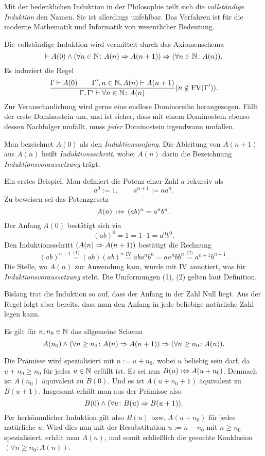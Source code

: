 Mit der bedenklichen Induktion in der Philosophie teilt sich die
\emph{vollständige Induktion} den Namen. Sie ist allerdings unfehlbar.
Das Verfahren ist für die moderne Mathematik und Informatik von
wesentlicher Bedeutung.

Die vollständige Induktion%
wird vermittelt durch das Axiomenschema
\[\vdash A(0)\land (\forall n\in\mathbb N\colon A(n)\Rightarrow A(n+1))
\Rightarrow (\forall n\in\mathbb N\colon A(n)).\]
Es induziert die Regel
\[\dfrac{\Gamma\vdash A(0)\qquad\Gamma',n\in\mathbb N,A(n)\vdash A(n+1)}{
\Gamma,\Gamma'\vdash\forall n\in\mathbb N\colon A(n)}(n\notin\mathrm{FV}(\Gamma')).\]
Zur Veranschaulichung wird gerne eine endlose Dominoreihe herangezogen.
Fällt der erste Dominostein um, und ist sicher, dass mit einem
Dominostein ebenso dessen Nachfolger umfällt, muss \emph{jeder}
Dominostein irgendwann umfallen.

Man bezeichnet $A(0)$ als den \emph{Induktionsanfang}.
Die Ableitung von $A(n+1)$ aus $A(n)$ heißt \emph{Induktionsschritt},
wobei $A(n)$ darin die Bezeichnung \emph{Induktionsvoraussetzung} trägt.

Ein erstes Beispiel. Man definiert die Potenz einer Zahl $a$ rekursiv als
\[a^0 := 1,\qquad a^{n+1} := aa^n.\]
Zu beweisen sei das Potenzgesetz
\[A(n)\,:\Leftrightarrow\, (ab)^n = a^n b^n.\]
Der Anfang $A(0)$ bestätigt sich via
\[(ab)^0 = 1 = 1\cdot 1 = a^0 b^0.\]
Den Induktionsschritt $(A(n)\Rightarrow A(n+1))$ bestätigt
die Rechnung
\[(ab)^{n+1}\stackrel{\text{(1)}}= (ab)(ab)^n
\stackrel{\text{IV}}= aba^n b^n = aa^n bb^n
\stackrel{\text{(2)}}= a^{n+1} b^{n+1}.\]
Die Stelle, wo $A(n)$ zur Anwendung kam, wurde mit IV annotiert,
was für \emph{Induktionsvoraussetzung} steht. Die Umformungen
(1), (2) gelten laut Definition.

Bislang trat die Induktion so auf, dass der Anfang in der
Zahl Null liegt. Aus der Regel folgt aber bereits, dass man den
Anfang in jede beliebige natürliche Zahl legen kann.
\begin{Satz}
Es gilt für $n,n_0\in\mathbb N$ das allgemeine Schema
\[A(n_0)\land (\forall n\ge n_0\colon A(n)\Rightarrow A(n+1))
\Rightarrow (\forall n\ge n_0\colon A(n)).\]
\end{Satz}
\begin{Beweis}
Die Prämisse wird spezialisiert mit $n:=u+n_0$, wobei $u$ beliebig sein
darf, da $u+n_0\ge n_0$ für jedes $u\in\mathbb N$
erfüllt ist. Es sei nun $B(u):\Leftrightarrow A(u+n_0)$. Demnach ist
$A(n_0)$ äquivalent zu $B(0)$. Und es ist $A(u+n_0+1)$ äquivalent
zu $B(u+1)$. Insgesamt erhält man aus der Prämisse also
\[B(0)\land (\forall u\colon B(u)\Rightarrow B(u+1)).\]
Per herkömmlicher Induktion gilt also $B(u)$ bzw. $A(u+n_0)$ für
jedes natürliche $u$. Wird dies nun mit der Resubstitution $u:=n-n_0$
mit $n\ge n_0$ spezialisiert, erhält man $A(n)$, und somit schließlich die
gesuchte Konklusion $(\forall n\ge n_0\colon A(n))$.\,\qedsymbol
\end{Beweis}

